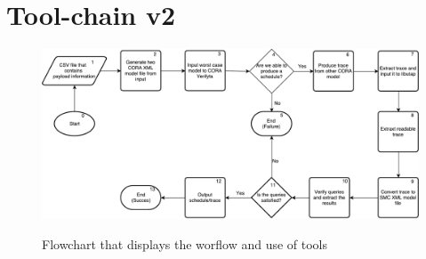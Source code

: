 \section{Tool-chain v2}

\begin{figure}
	\includegraphics[width=\textwidth]{graphics/tool2.pdf}
	\label{fig:tool1}
	\caption{Flowchart that displays the worflow and use of tools}
\end{figure}